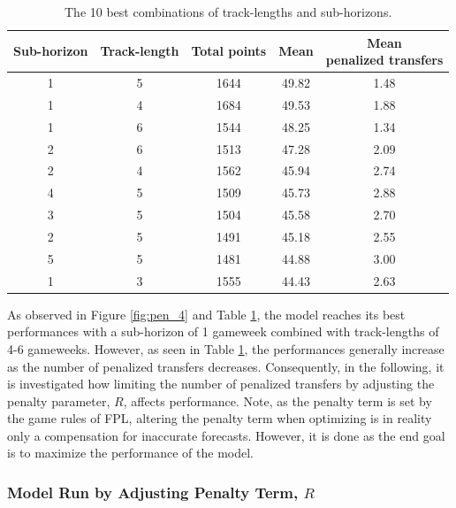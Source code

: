 \begin{table}[H]
\centering
\begin{tabular}{|c|c|c|c|c|}
\hline
Sub-horizon & Track-length & Total points & Mean &  \makecell{Mean \\ penalized transfers} \\
\hline
1       & 5          & 1644             & 49.82 & 1.48       \\
1       & 4          & 1684             & 49.53 & 1.88       \\
1       & 6          & 1544             & 48.25 & 1.34       \\
2       & 6          & 1513             & 47.28 & 2.09       \\
2       & 4          & 1562             & 45.94 & 2.74       \\
4       & 5          & 1509             & 45.73 & 2.88       \\
3       & 5          & 1504             & 45.58 & 2.70       \\
2       & 5          & 1491             & 45.18 & 2.55       \\
5       & 5          & 1481             & 44.88 & 3.00       \\
1       & 3          & 1555             & 44.43 & 2.63       \\
\hline
\end{tabular}
\caption{The 10 best combinations of track-lengths and sub-horizons.}
\label{tab:pen_4_ill_trans}
\end{table}


As observed in Figure \ref{fig:pen_4} and Table \ref{tab:pen_4_ill_trans}, the model reaches its best performances with a sub-horizon of 1 gameweek combined with track-lengths of 4-6 gameweeks. However, as seen in Table \ref{tab:pen_4_ill_trans}, the performances generally increase as the number of penalized transfers decreases. Consequently, in the following, it is investigated how limiting the number of penalized transfers by adjusting the penalty parameter, $R$, affects performance. Note, as the penalty term is set by the game rules of FPL, altering the penalty term when optimizing is in reality only a compensation for inaccurate forecasts. However, it is done as the end goal is to maximize the performance of the model. 


\subsubsection{Model Run by Adjusting Penalty Term, $R$}

